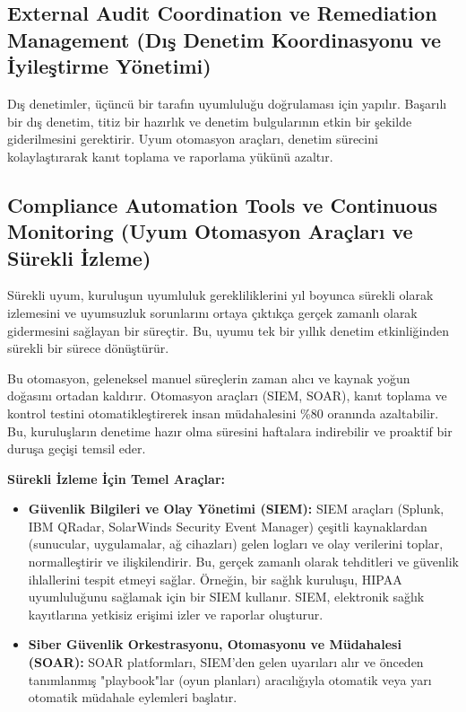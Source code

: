 \subsection{External Audit Coordination ve Remediation Management (Dış Denetim Koordinasyonu ve İyileştirme Yönetimi)}

Dış denetimler, üçüncü bir tarafın uyumluluğu doğrulaması için yapılır. Başarılı bir dış denetim, titiz bir hazırlık ve denetim bulgularının etkin bir şekilde giderilmesini gerektirir. Uyum otomasyon araçları, denetim sürecini kolaylaştırarak kanıt toplama ve raporlama yükünü azaltır.

\subsection{Compliance Automation Tools ve Continuous Monitoring (Uyum Otomasyon Araçları ve Sürekli İzleme)}

Sürekli uyum, kuruluşun uyumluluk gerekliliklerini yıl boyunca sürekli olarak izlemesini ve uyumsuzluk sorunlarını ortaya çıktıkça gerçek zamanlı olarak gidermesini sağlayan bir süreçtir. Bu, uyumu tek bir yıllık denetim etkinliğinden sürekli bir sürece dönüştürür.

Bu otomasyon, geleneksel manuel süreçlerin zaman alıcı ve kaynak yoğun doğasını ortadan kaldırır. Otomasyon araçları (SIEM, SOAR), kanıt toplama ve kontrol testini otomatikleştirerek insan müdahalesini \%80 oranında azaltabilir. Bu, kuruluşların denetime hazır olma süresini haftalara indirebilir ve proaktif bir duruşa geçişi temsil eder.

\textbf{Sürekli İzleme İçin Temel Araçlar:}
\begin{itemize}
    \item \textbf{Güvenlik Bilgileri ve Olay Yönetimi (SIEM):} SIEM araçları (Splunk, IBM QRadar, SolarWinds Security Event Manager) çeşitli kaynaklardan (sunucular, uygulamalar, ağ cihazları) gelen logları ve olay verilerini toplar, normalleştirir ve ilişkilendirir. Bu, gerçek zamanlı olarak tehditleri ve güvenlik ihlallerini tespit etmeyi sağlar. Örneğin, bir sağlık kuruluşu, HIPAA uyumluluğunu sağlamak için bir SIEM kullanır. SIEM, elektronik sağlık kayıtlarına yetkisiz erişimi izler ve raporlar oluşturur.
    \item \textbf{Siber Güvenlik Orkestrasyonu, Otomasyonu ve Müdahalesi (SOAR):} SOAR platformları, SIEM'den gelen uyarıları alır ve önceden tanımlanmış "playbook"lar (oyun planları) aracılığıyla otomatik veya yarı otomatik müdahale eylemleri başlatır.
\end{itemize}

